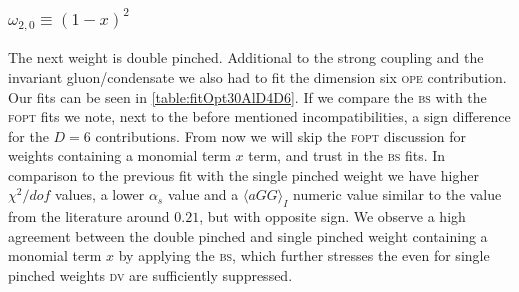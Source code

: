 \documentclass[../../index.tex]{subfiles}
\begin{document}
\subsubsection{\(\omega_{2,0} \equiv (1-x)^2\)}
The next weight is double pinched. Additional to the strong coupling and the
invariant gluon\-/condensate we also had to fit the dimension six \textsc{ope}
contribution. Our fits can be seen in \cref{table:fitOpt30AlD4D6}. If we compare
the \textsc{bs} with the \textsc{fopt} fits we note, next to the before
mentioned incompatibilities, a sign difference for the \(D=6\) contributions.
From now we will skip the \textsc{fopt} discussion for weights containing a
monomial term \(x\) term, and trust in the \textsc{bs} fits. In comparison to
the previous fit with the single pinched weight we have higher \(\chi^2/dof\)
values, a lower \(\alpha_s\) value and a \(\langle aGG \rangle_I\) numeric value
similar to the value from the literature around \(0.21\), but with opposite
sign. We observe a high agreement between the double pinched and single pinched
weight containing a monomial term \(x\) by applying the \textsc{bs}, which
further stresses the even for single pinched weights \textsc{dv} are
sufficiently suppressed.
\end{document}
